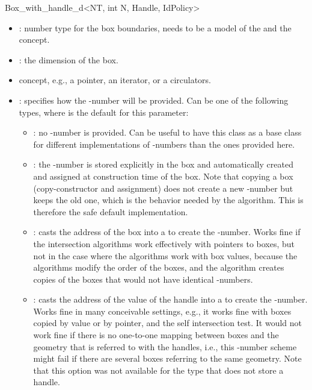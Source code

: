 \begin{ccRefClass}{Box_with_handle_d<NT, int N, Handle, IdPolicy>}
\begin{itemize}
  \item
    : number type for the box boundaries, needs to be a model
    of the  and the  concept.
  \item
    : the dimension of the box.
  \item
     concept, e.g., a pointer, an iterator, or a circulators.
  \item
    : specifies how the -number will be
    provided. Can be one of the following types, where
     is the default for this parameter:
    \begin{itemize}
      \item
        : no -number is provided. Can be useful
        to have this class as a base class for different
        implementations of -numbers than the ones provided
        here.
      \item
        : the -number is stored explicitly in
        the box and automatically created and assigned at construction
        time of the box. Note that copying a box (copy-constructor and
        assignment) does not create a new -number but keeps
        the old one, which is the behavior needed by the
         algorithm. This is therefore
        the safe default implementation. 
      \item
        : casts the address of the box into a
         to create the -number. Works fine 
        if the intersection algorithms work effectively with pointers
        to boxes, but not in the case where the algorithms work with
        box values, because the algorithms modify the order of the
        boxes, and the  algorithm
        creates copies of the boxes that would not have identical
        -numbers.  
      \item
        : casts the address of the value of the
        handle into a  to create the
        -number. Works fine in many conceivable settings, e.g.,
        it works fine with boxes copied by value or by pointer, and
        the self intersection test. It would not work fine if there
        is no one-to-one mapping between boxes and the geometry that
        is referred to with the handles, i.e., this -number
        scheme might fail if there are several boxes referring to the
        same geometry. Note that this option was not
        available for the  type
        that does not store a handle.
    \end{itemize}
\end{itemize}


\end{ccRefClass}
